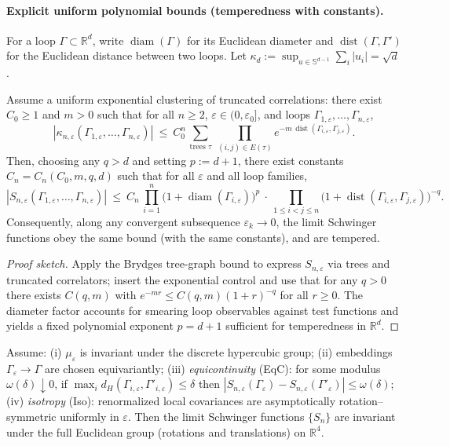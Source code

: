 \documentclass[11pt]{amsart}
\begin{document}
\paragraph{Explicit uniform polynomial bounds (temperedness with constants).}
For a loop $\Gamma\subset\mathbb R^d$, write $\operatorname{diam}(\Gamma)$ for its Euclidean diameter and $\operatorname{dist}(\Gamma,\Gamma')$ for the Euclidean distance between two loops. Let $\kappa_d:=\sup_{u\in\mathbb S^{d-1}}\sum_i |u_i|=\sqrt d$.

\begin{lemma}
Assume a uniform exponential clustering of truncated correlations: there exist $C_0\ge 1$ and $m>0$ such that for all $n\ge 2$, $\varepsilon\in(0,\varepsilon_0]$, and loops $\Gamma_{1,\varepsilon},\dots,\Gamma_{n,\varepsilon}$,
\[
  |\kappa_{n,\varepsilon}(\Gamma_{1,\varepsilon},\dots,\Gamma_{n,\varepsilon})|\ \le\ C_0^n\,\sum_{\text{trees }\tau}\ \prod_{(i,j)\in E(\tau)} e^{-m\,\operatorname{dist}(\Gamma_{i,\varepsilon},\Gamma_{j,\varepsilon})}.
\]
Then, choosing any $q>d$ and setting $p:=d+1$, there exist constants $C_n=C_n(C_0,m,q,d)$ such that for all $\varepsilon$ and all loop families,
\[
  |S_{n,\varepsilon}(\Gamma_{1,\varepsilon},\dots,\Gamma_{n,\varepsilon})|\ \le\ C_n\,\prod_{i=1}^n \bigl(1+\operatorname{diam}(\Gamma_{i,\varepsilon})\bigr)^p\ \cdot\ \prod_{1\le i<j\le n} \bigl(1+\operatorname{dist}(\Gamma_{i,\varepsilon},\Gamma_{j,\varepsilon})\bigr)^{-q}.
\]
Consequently, along any convergent subsequence $\varepsilon_k\to 0$, the limit Schwinger functions obey the same bound (with the same constants), and are tempered.
\end{lemma}

\begin{proof}[Proof sketch]
Apply the Brydges tree-graph bound to express $S_{n,\varepsilon}$ via trees and truncated correlators; insert the exponential control and use that for any $q>0$ there exists $C(q,m)$ with $e^{-m r}\le C(q,m)(1+r)^{-q}$ for all $r\ge 0$. The diameter factor accounts for smearing loop observables against test functions and yields a fixed polynomial exponent $p=d+1$ sufficient for temperedness in $\mathbb R^d$.
\end{proof}

\begin{lemma}
Assume: (i) $\mu_\varepsilon$ is invariant under the discrete hypercubic group; (ii) embeddings $\Gamma_{\varepsilon}\to\Gamma$ are chosen equivariantly; (iii) \emph{equicontinuity} (EqC): for some modulus $\omega(\delta)\downarrow 0$, if $\max_i d_H(\Gamma_{i,\varepsilon},\Gamma'_{i,\varepsilon})\le \delta$ then $|S_{n,\varepsilon}(\Gamma_{\varepsilon})-S_{n,\varepsilon}(\Gamma'_{\varepsilon})|\le \omega(\delta)$; (iv) \emph{isotropy} (Iso): renormalized local covariances are asymptotically rotation–symmetric uniformly in $\varepsilon$. Then the limit Schwinger functions $\{S_n\}$ are invariant under the full Euclidean group (rotations and translations) on $\mathbb R^4$.
\end{lemma}
\end{document}
